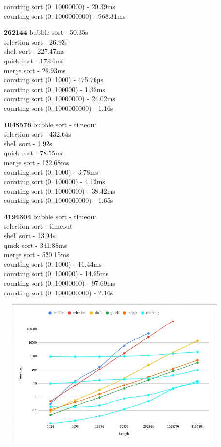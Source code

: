 \documentclass{article}
\begin{document}
\begin{normalsize}
\begin{multicols}{2}
\begin{enumerate}
			counting sort (0..10000000) - 20.39ms\\
			counting sort (0..1000000000) - 968.31ms
			\columnbreak
			\item [\textbf{262144}] bubble sort - 50.35s\\
			selection sort - 26.93s\\
			shell sort - 227.47ms\\
			quick sort - 17.64ms\\
			merge sort - 28.93ms\\
			counting sort (0..1000) - 475.76µs\\
			counting sort (0..100000) - 1.38ms\\
			counting sort (0..10000000) - 24.02ms\\
			counting sort (0..1000000000) - 1.16s
			\item [\textbf{1048576}] bubble sort - timeout\\
			selection sort - 432.64s\\
			shell sort - 1.92s\\
			quick sort - 78.55ms\\
			merge sort - 122.68ms\\
			counting sort (0..1000) - 3.78ms\\
			counting sort (0..100000) - 4.13ms\\
			counting sort (0..10000000) - 38.42ms\\
			counting sort (0..1000000000) - 1.65s
			\item [\textbf{4194304}] bubble sort - timeout\\
			selection sort - timeout\\
			shell sort - 13.94s\\
			quick sort - 341.88ms\\
			merge sort - 520.15ms\\
			counting sort (0..1000) - 11.44ms\\
			counting sort (0..100000) - 14.85ms\\
			counting sort (0..10000000) - 97.69ms\\
			counting sort (0..1000000000) - 2.16s
		\end{enumerate}
	\end{multicols}
		\begin{figure}[H]
			\centering
			\includegraphics[scale=0.5]{1}	

\end{figure}
\end{normalsize}
\end{document}
